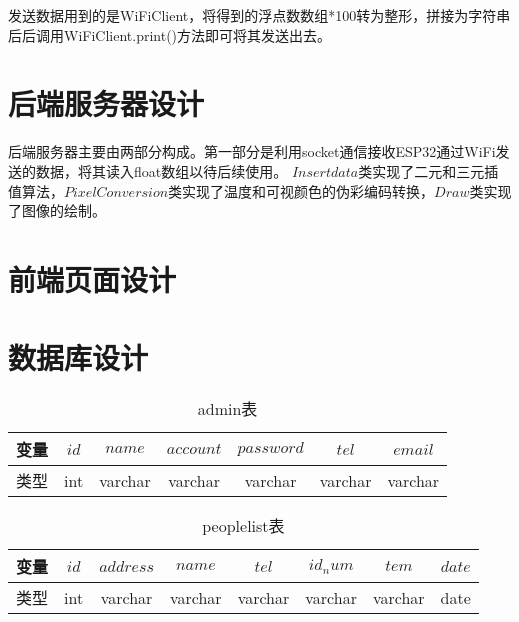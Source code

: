 发送数据用到的是WiFiClient，将得到的浮点数数组*100转为整形，拼接为字符串后后调用WiFiClient.print()方法即可将其发送出去。
\section{后端服务器设计}
后端服务器主要由两部分构成。第一部分是利用socket通信接收ESP32通过WiFi发送的数据，将其读入float数组以待后续使用。
$Insertdata$类实现了二元和三元插值算法，$PixelConversion$类实现了温度和可视颜色的伪彩编码转换，$Draw$类实现了图像的绘制。
\section{前端页面设计}
\section{数据库设计}
\begin{table}[htbp]
    \caption{admin表}\label{tab:table1}
    \vspace{0.5em}\centering\wuhao
    \begin{tabular}{ccccccc}
    \toprule[1.5pt]
    变量 & $id$ & $name$ & $account$&$password$ &$tel$&$email$\\
    \midrule[1pt]
    类型& int & varchar & varchar&varchar&varchar&varchar\\
    \bottomrule[1.5pt]
    \end{tabular}
    \vspace{\baselineskip}
    \end{table}
    
    \begin{table}[htbp]
        \caption{peoplelist表}\label{tab:table2}
        \vspace{0.5em}\centering\wuhao
        \begin{tabular}{cccccccc}
        \toprule[1.5pt]
        变量 & $id$&$address$ & $name$ & $tel$&$id_num$ &$tem$&$date$\\
        \midrule[1pt]
        类型& int & varchar & varchar&varchar&varchar&varchar&date\\
        \bottomrule[1.5pt]
        \end{tabular}
        \vspace{\baselineskip}
        \end{table}
